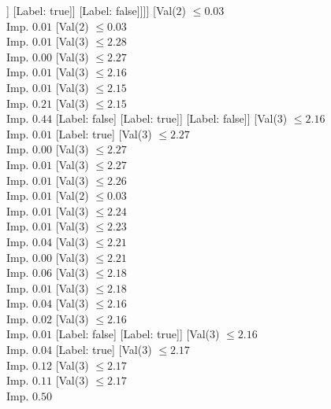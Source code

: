\documentclass[margin=10pt]{standalone}
\begin{document}
\begin{forest}
									]
								[Label: true]]
							[Label: false]]]]
				[Val($2$) $ \leq 0.03$ \\ Imp. $0.01$
					[Val($2$) $ \leq 0.03$ \\ Imp. $0.01$
						[Val($3$) $ \leq 2.28$ \\ Imp. $0.00$
							[Val($3$) $ \leq 2.27$ \\ Imp. $0.01$
								[Val($3$) $ \leq 2.16$ \\ Imp. $0.01$
									[Val($3$) $ \leq 2.15$ \\ Imp. $0.21$
										[Val($3$) $ \leq 2.15$ \\ Imp. $0.44$
											[Label: false]
											[Label: true]]
										[Label: false]]
									[Val($3$) $ \leq 2.16$ \\ Imp. $0.01$
										[Label: true]
										[Val($3$) $ \leq 2.27$ \\ Imp. $0.00$
											[Val($3$) $ \leq 2.27$ \\ Imp. $0.01$
												[Val($3$) $ \leq 2.27$ \\ Imp. $0.01$
													[Val($3$) $ \leq 2.26$ \\ Imp. $0.01$
														[Val($2$) $ \leq 0.03$ \\ Imp. $0.01$
															[Val($3$) $ \leq 2.24$ \\ Imp. $0.01$
																[Val($3$) $ \leq 2.23$ \\ Imp. $0.04$
																	[Val($3$) $ \leq 2.21$ \\ Imp. $0.00$
																		[Val($3$) $ \leq 2.21$ \\ Imp. $0.06$
																			[Val($3$) $ \leq 2.18$ \\ Imp. $0.01$
																				[Val($3$) $ \leq 2.18$ \\ Imp. $0.04$
																					[Val($3$) $ \leq 2.16$ \\ Imp. $0.02$
																						[Val($3$) $ \leq 2.16$ \\ Imp. $0.01$
																							[Label: false]
																							[Label: true]]
																						[Val($3$) $ \leq 2.16$ \\ Imp. $0.04$
																							[Label: true]
																							[Val($3$) $ \leq 2.17$ \\ Imp. $0.12$
																								[Val($3$) $ \leq 2.17$ \\ Imp. $0.11$
																									[Val($3$) $ \leq 2.17$ \\ Imp. $0.50$

\end{forest}
\end{document}
